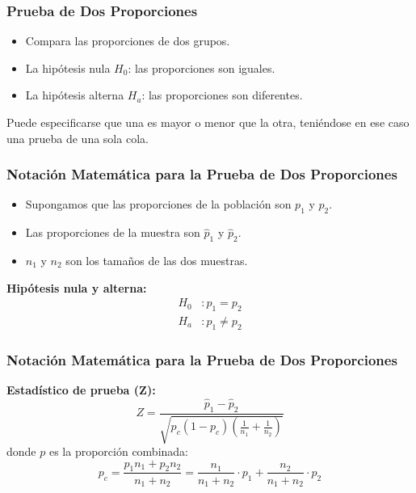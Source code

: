 \documentclass[aspectratio=169]{beamer}
\begin{document}
\begin{frame}
\frametitle{Prueba de Dos Proporciones}

\begin{itemize}
    \item Compara las proporciones de dos grupos.

    \item La hipótesis nula \( H_0 \): las proporciones son iguales.
    \item La hipótesis alterna \( H_a \): las proporciones son diferentes.
\end{itemize}

\vfill

Puede especificarse que una es mayor o menor que la otra, teniéndose en ese caso una prueba de una sola cola.


\end{frame}


\begin{frame}
\frametitle{Notación Matemática para la Prueba de Dos Proporciones}

\begin{itemize}
    \item Supongamos que las proporciones de la población son \( p_1 \) y \( p_2 \).
    \item Las proporciones de la muestra son \( \hat{p}_1 \) y \( \hat{p}_2 \).
    \item \( n_1 \) y \( n_2 \) son los tamaños de las dos muestras.
\end{itemize}

\vfill

\textbf{Hipótesis nula y alterna:}
\begin{align*}
H_0 &: p_1 = p_2 \\
H_a &: p_1 \neq p_2
\end{align*}
\end{frame}


\begin{frame}
\frametitle{Notación Matemática para la Prueba de Dos Proporciones}


\textbf{Estadístico de prueba (Z):}
\[ Z = \frac{\hat{p}_1 - \hat{p}_2}{\sqrt{p_c(1-p_c) \left( \frac{1}{n_1} + \frac{1}{n_2} \right)}} \]
donde \( p \) es la proporción combinada:
\[ p_c = \frac{p_1 n_1 + p_2 n_2}{n_1 + n_2} =  \frac{n_1}{n_1 + n_2} \cdot p_1 + \frac{n_2}{n_1 + n_2} \cdot p_2 \]

\end{frame}
\end{document}
